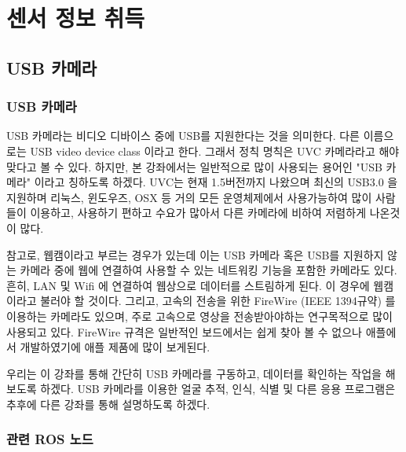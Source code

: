 
\chapter{센서 정보 취득}

\section{USB 카메라}

\subsection{USB 카메라}

USB 카메라는 비디오 디바이스 중에 USB를 지원한다는 것을 의미한다. 다른 이름으로는 USB video device class 이라고 한다. 그래서 정칙 명칙은 UVC 카메라라고 해야 맞다고 볼 수 있다. 하지만, 본 강좌에서는 일반적으로 많이 사용되는 용어인 "USB 카메라" 이라고 칭하도록 하겠다. UVC는 현재 1.5버전까지 나왔으며 최신의 USB3.0 을 지원하며 리눅스, 윈도우즈, OSX 등 거의 모든 운영체제에서 사용가능하여 많이 사람들이 이용하고, 사용하기 편하고 수요가 많아서 다른 카메라에 비하여 저렴하게 나온것이 많다.

참고로, 웹캠이라고 부르는 경우가 있는데 이는 USB 카메라 혹은 USB를 지원하지 않는 카메라 중에 웹에 연결하여 사용할 수 있는 네트워킹 기능을 포함한 카메라도 있다. 흔히, LAN 및  Wifi 에 연결하여 웹상으로 데이터를 스트림하게 된다. 이 경우에 웹캠이라고 불러야 할 것이다. 그리고, 고속의 전송을 위한 FireWire (IEEE 1394규약) 를 이용하는 카메라도 있으며, 주로 고속으로 영상을 전송받아야하는 연구목적으로 많이 사용되고 있다. FireWire 규격은 일반적인 보드에서는 쉽게 찾아 볼 수 없으나 애플에서 개발하였기에 애플 제품에 많이 보게된다.

우리는 이 강좌를 통해 간단히 USB 카메라를 구동하고, 데이터를 확인하는 작업을 해보도록 하겠다.  USB 카메라를 이용한 얼굴 추적, 인식, 식별 및 다른 응용 프로그램은 추후에 다른 강좌를 통해 설명하도록 하겠다.

\subsection{관련 ROS 노드}

